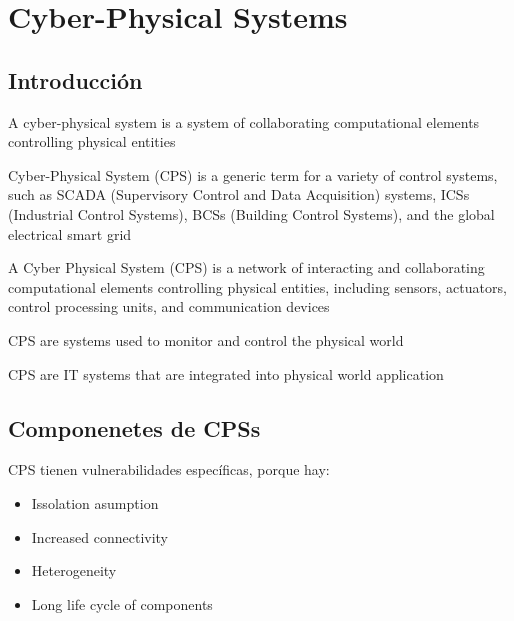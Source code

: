 \chapter{Cyber-Physical Systems}

\section{Introducción}


\begin{definition}
   [CPS]
   A cyber-physical system is a system of collaborating computational
   elements controlling physical entities
\end{definition}
Cyber-Physical System (CPS) is a generic term for a variety of
control systems, such as SCADA (Supervisory Control and Data
Acquisition) systems, ICSs (Industrial Control Systems), BCSs
(Building Control Systems), and the global electrical smart grid

\begin{definition}
   [CPS - 2]
   A Cyber Physical System (CPS) is a network of interacting and
   collaborating computational elements controlling physical entities,
   including sensors, actuators, control processing units, and
   communication devices
\end{definition}

\begin{definition}
   [CPS - 3]
   CPS are systems used to monitor and control the physical world
\end{definition}

\begin{definition}
   [CPS - 4]
   CPS are IT systems that are integrated into physical world application
\end{definition}


\section{Componenetes de CPSs}

CPS tienen vulnerabilidades específicas, porque hay:
\begin{itemize}
	\item Issolation asumption
	\item Increased connectivity
	\item Heterogeneity
	\item Long life cycle of components
\end{itemize}

